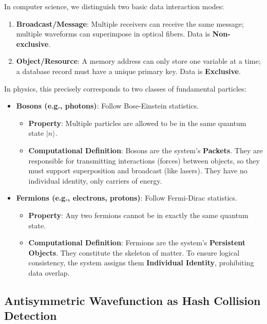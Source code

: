 In computer science, we distinguish two basic data interaction modes:

\begin{enumerate}
\item \textbf{Broadcast/Message}: Multiple receivers can receive the same message; multiple waveforms can superimpose in optical fibers. Data is \textbf{Non-exclusive}.

\item \textbf{Object/Resource}: A memory address can only store one variable at a time; a database record must have a unique primary key. Data is \textbf{Exclusive}.
\end{enumerate}

In physics, this precisely corresponds to two classes of fundamental particles:

\begin{itemize}
\item \textbf{Bosons (e.g., photons)}: Follow Bose-Einstein statistics.

    \begin{itemize}
    \item \textbf{Property}: Multiple particles are allowed to be in the same quantum state $|n\rangle$.

    \item \textbf{Computational Definition}: Bosons are the system's \textbf{Packets}. They are responsible for transmitting interactions (forces) between objects, so they must support superposition and broadcast (like lasers). They have no individual identity, only carriers of energy.
    \end{itemize}

\item \textbf{Fermions (e.g., electrons, protons)}: Follow Fermi-Dirac statistics.

    \begin{itemize}
    \item \textbf{Property}: Any two fermions cannot be in exactly the same quantum state.

    \item \textbf{Computational Definition}: Fermions are the system's \textbf{Persistent Objects}. They constitute the skeleton of matter. To ensure logical consistency, the system assigns them \textbf{Individual Identity}, prohibiting data overlap.
    \end{itemize}
\end{itemize}

\subsection{Antisymmetric Wavefunction as Hash Collision Detection}


